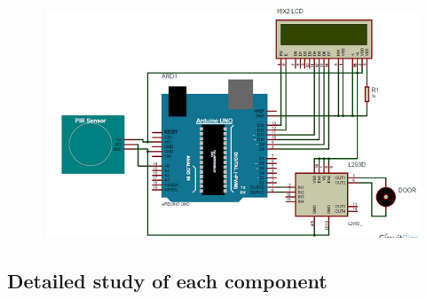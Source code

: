 \documentclass{article}
\begin{document}
\begin{figure}[H]
\centering
\includegraphics[scale = 0.5 ]{./figs/circuit.png}
\end{figure}

\subsection{Detailed study of each component}
\end{document}
